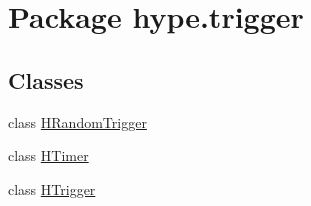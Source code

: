 \hypertarget{namespacehype_1_1trigger}{\section{Package hype.\-trigger}
\label{namespacehype_1_1trigger}
}
\subsection*{Classes}
\begin{DoxyCompactItemize}
\item 
class \hyperlink{classhype_1_1trigger_1_1_h_random_trigger}{H\-Random\-Trigger}
\item 
class \hyperlink{classhype_1_1trigger_1_1_h_timer}{H\-Timer}
\item 
class \hyperlink{classhype_1_1trigger_1_1_h_trigger}{H\-Trigger}
\end{DoxyCompactItemize}
